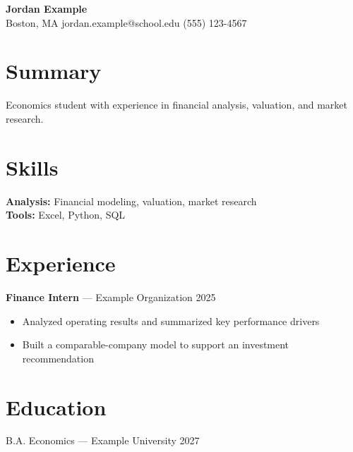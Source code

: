 \documentclass[11pt]{article}
\begin{document}
\begin{center}
{\LARGE \textbf{Jordan Example}} \\
Boston, MA \quad jordan.example@school.edu \quad (555) 123-4567
\end{center}

\section*{Summary}
Economics student with experience in financial analysis, valuation, and market research.

\section*{Skills}
\textbf{Analysis:} Financial modeling, valuation, market research \\
\textbf{Tools:} Excel, Python, SQL

\section*{Experience}
\textbf{Finance Intern} --- Example Organization \hfill 2025 \\
\begin{itemize}[nosep]
  \item Analyzed operating results and summarized key performance drivers
  \item Built a comparable-company model to support an investment recommendation
\end{itemize}

\section*{Education}
B.A. Economics --- Example University \hfill 2027
\end{document}
